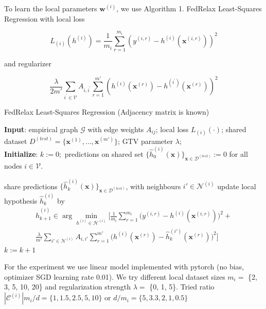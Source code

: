 \documentclass{article}
\newcommand{\graph}{\mathcal{G}}
\begin{document}
To learn the local parameters $\mathbf{w}^{(i)}$, we use Algorithm 1. FedRelax Least-Squares Regression with local loss 

\begin{equation}
{L}_{(i)}({h}^{(i)}) = \frac{1}{{m}_{i}} \sum_{r=1}^{{m}_{i}}\left({y}^{(i,r)} - {h}^{(i)}(\mathbf{x}^{(i,r)}) \right)^2
\end{equation}

and  regularizer 

\begin{equation}
\frac{\lambda}{2m'} \sum_{{i}^{'} \in {\mathcal V}} {A}_{i,{i}^{'}} \sum_{r=1}^{m'} \left({h}^{(i)}(\mathbf{x}^{(r)}) - {h}^{({i}^{'})}(\mathbf{x}^{(r)}) \right)^2
\end{equation}

\newpage
\begin{algorithm}[htbp]
	\caption{FedRelax Least-Squares Regression (Adjacency matrix is known)}
	\label{alg_X_param}
	{\bf Input}: empirical graph $\graph$ with edge weights $A_{ij}$; 
	local loss $L_{(i)}{(\cdot)}$; shared dataset $D^{(test)} = \{\mathbf{x}^{(1)}, ..., \mathbf{x}^{(m')}\}$; GTV parameter $\lambda$; \\
	{\bf Initialize}: $k:=0;$ predictions on shared set $\{\widehat{h}_{0}^{(i)}(\mathbf{x})\}_{\mathbf{x} \in \mathcal{D}^(test)}:=0$ for all nodes $i \in \mathcal{V}$.
	\begin{algorithmic}[1]
		\State share predictions $\{\widehat{h}_{k}^{(i)}(\mathbf{x})\}_{\mathbf{x} \in \mathcal{D}^(test)}$, 
		with neighbours $i' \in \mathcal{N}^{(i)}$ 
		\State update local hypothesis $\widehat{h}_{k}^{(i)}$ by
            \begin{multline*}
            \widehat{h}_{k+1}^{(i)} \in  \arg \min_{h^{(i)} \in \mathcal{H}^{(i)}} 
            \biggl[ \frac{1}{m_i}  \sum_{r=1}^{m_i} \biggl( y^{(i,r)} - h^{(i)}(\mathbf{x}^{(i,r)})  \biggr)^2 + \\
            \frac{\lambda}{m'} \sum_{i' \in \mathcal{N}^{(i)}}A_{i,i'}\sum_{r=1}^{m'} \biggl( h^{(i)}(\mathbf{x}^{(r)}) - \widehat{h}_{k}^{(i')}(\mathbf{x}^{(r)}) \biggr)^2 \biggr]
            \end{multline*}
		\EndFor
		\State $k := k+1$
		\EndWhile
	\end{algorithmic}
\end{algorithm}

For the experiment we use linear model implemented with pytorch (no bias, optimizer SGD learning rate 0.01). We try different local dataset sizes $m_i =$ \{2, 3, 5, 10, 20\} and regularization strength $\lambda =$ \{0, 1, 5\}. Tried ratio $|\mathcal{C}^{(i)}|m_i / d = \{1, 1.5, 2.5, 5, 10\}$ or $d / m_i = \{5, 3.3, 2, 1, 0.5\}$ 
\end{document}
